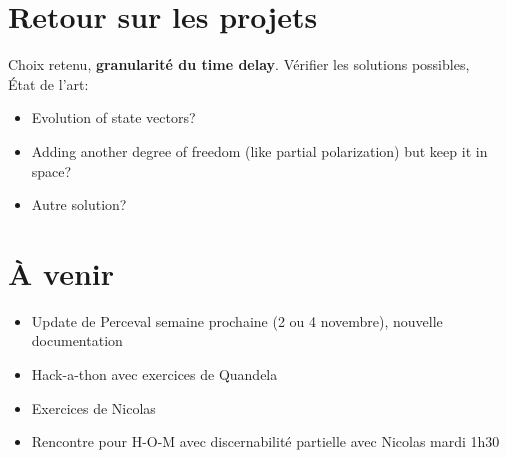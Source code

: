 \documentclass[letterpaper,12pt,oneside,final]{article}
\begin{document}
\section*{Retour sur les projets}
Choix retenu, \textbf{granularité du time delay}. Vérifier les solutions possibles,  \\ 
État de l'art:
\begin{itemize}
    \item Evolution of state vectors?
    \item Adding another degree of freedom (like partial polarization) but keep it in space?
    \item Autre solution?
\end{itemize}

\section*{À venir}
\begin{itemize}
    \item Update de Perceval semaine prochaine (2 ou 4 novembre), nouvelle documentation
    \item Hack-a-thon avec exercices de Quandela
    \item Exercices de Nicolas
    \item Rencontre pour H-O-M avec discernabilité partielle avec Nicolas mardi 1h30
\end{itemize}
\end{document}
